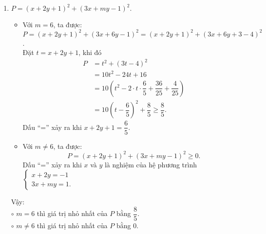 \begin{ex}
{\begin{enumerate}
  \item $P = (x + 2y + 1)^2 + (3x + my - 1)^2$.
  \begin{itemize}
   \item Với $m=6$, ta được:
   $P = (x + 2y + 1)^2 + (3x + 6y - 1)^2 = (x + 2y + 1)^2 + (3x + 6y + 3 - 4)^2$.\\
   Đặt $t = x + 2y + 1$, khi đó
   \begin{align*}
   P & = t^2 + (3t - 4)^2 \\
     & = 10t^2 - 24t + 16 \\
     & = 10 \left( t^2 - 2 \cdot t \cdot \dfrac{6}{5} + \dfrac{36}{25} + \dfrac{4}{25} \right) \\
     & = 10 \left( t - \dfrac{6}{5} \right)^2 + \dfrac{8}{5} \geq \dfrac{8}{5}.
   \end{align*}
   Dấu ``='' xảy ra khi $x + 2y + 1 = \dfrac{6}{5}$.
   \item Với $m \neq 6$, ta được:
   $$P = (x + 2y + 1)^2 + (3x + my - 1)^2 \geq 0.$$
   Dấu ``='' xảy ra khi $x$ và $y$ là nghiệm của hệ phương trình $\begin{cases} x + 2y = -1 \\ 3x + my = 1. \end{cases}$
  \end{itemize}
  Vậy:\\
  $\circ$ $m = 6$ thì giá trị nhỏ nhất của $P$ bằng $\dfrac{8}{5}$.\\
  $\circ$ $m \neq 6$ thì giá trị nhỏ nhất của $P$ bằng $0$.
 \end{enumerate}
 }
\end{ex}


